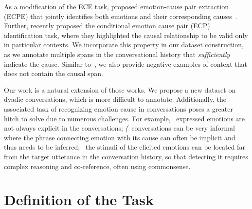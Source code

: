 \documentclass[smallextended]{svjour3}
\newcommand\0{\hphantom{0}}
\begin{document}
As a modification of the ECE task, \citet{DBLP:conf/acl/XiaD19} proposed emotion-cause pair extraction (ECPE) that jointly identifies both emotions and their corresponding causes~\cite{DBLP:conf/emnlp/ChenHCL18}. Further, \citet{chen-etal-2020-conditional} recently proposed the conditional emotion cause pair (ECP) identification task, where they highlighted the causal relationship to be valid only in particular contexts. We incorporate this property in our dataset construction, as we annotate multiple spans in the conversational history that \textit{sufficiently} indicate the cause. Similar to~\citet{chen-etal-2020-conditional}, we also provide negative examples of context that does not contain the causal span. 

Our work is a natural extension of those works. We propose a new dataset on dyadic conversations, which is more difficult to annotate. Additionally, the associated task of recognizing emotion cause in conversations poses a greater hitch to solve due to numerous challenges. For example, \textit{}~expressed emotions are not always explicit in the conversations; \textit{(}~conversations can be very informal where the phrase connecting emotion with its cause can often be implicit and thus needs to be inferred; \textit{}~the stimuli of the elicited emotions can be located far from the target utterance in the conversation history, so that detecting it requires complex reasoning and co-reference, often using commonsense.






























\section{Definition of the Task}
\label{sec:terminology}
\end{document}
